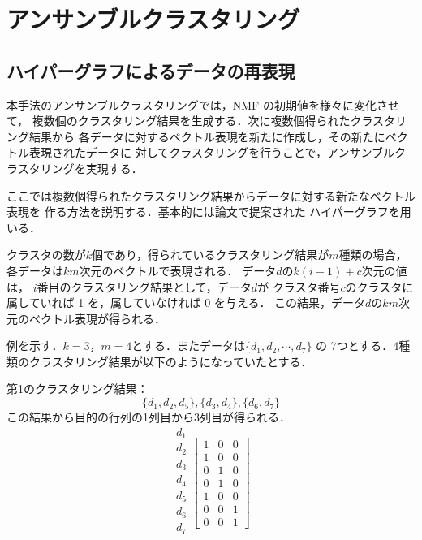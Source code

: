 \documentclass[japanese]{jnlp_1.3e}
\begin{document}
\section{アンサンブルクラスタリング}


\subsection{ハイパーグラフによるデータの再表現}

本手法のアンサンブルクラスタリングでは，NMF の初期値を様々に変化させて，
複数個のクラスタリング結果を生成する．次に複数個得られたクラスタリング結果から
各データに対するベクトル表現を新たに作成し，その新たにベクトル表現されたデータに
対してクラスタリングを行うことで，アンサンブルクラスタリングを実現する．

ここでは複数個得られたクラスタリング結果からデータに対する新たなベクトル表現を
作る方法を説明する．基本的には論文\cite{strehl02}で提案された
ハイパーグラフを用いる．

クラスタの数が\( k \)個であり，得られているクラスタリング結果が\( m \)種類の場合，
各データは\( k m \)次元のベクトルで表現される．
データ\( d \)の\( k (i - 1) + c \)次元の値は，
\( i \)番目のクラスタリング結果として，データ\( d \)が
クラスタ番号\( c \)のクラスタに属していれば 1 を，属していなければ 0 を与える．
この結果，データ\( d \)の\( k m \)次元のベクトル表現が得られる．

例を示す．\( k = 3\)，\( m = 4\)とする．またデータは\( \{ d_1,d_2, \cdots, d_7 \} \) の
7つとする．4種類のクラスタリング結果が以下のようになっていたとする．

第1のクラスタリング結果：
\[
\{ d_1,d_2,d_5 \}, \{ d_3,d_4 \}, \{ d_6,d_7 \}
\]
この結果から目的の行列の1列目から3列目が得られる．
\[
                        \begin{array}{c}
                                 d_1\\
                                 d_2\\
                                 d_3\\
                                 d_4\\
                                 d_5\\
                                 d_6\\
                                 d_7\\
                        \end{array}
\left[
                        \begin{array}{rrr}
                                 1& 0& 0\\
                                 1& 0& 0\\
                                 0& 1& 0\\
                                 0& 1& 0\\
                                 1& 0& 0\\
                                 0& 0& 1\\
                                 0& 0& 1
                        \end{array}
\right]
\]
\end{document}
